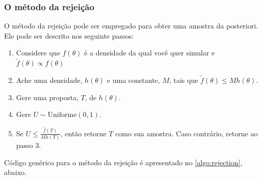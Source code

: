 \subsubsection{O método da rejeição}

O método da rejeição pode ser empregado
para obter uma amostra da posteriori.
Ele pode ser descrito nos seguinte passos:

\begin{enumerate}
 \item Considere que $f(\theta)$ é a
 densidade da qual você quer simular e
 $\tilde{f}(\theta) \propto f(\theta)$
 \item Ache uma densidade, $h(\theta)$ e
 uma constante, $M$, tais que
 $\tilde{f}(\theta) \leq M h(\theta)$.
 \item Gere uma proposta, $T$, de $h(\theta)$.
 \item Gere $U \sim \text{Uniforme}(0,1)$.
 \item Se $U \leq \frac{\tilde{f}(T)}{Mh(T)}$, então
 retorne $T$ como sua amostra.
 Caso contrário, retorne ao passo 3.
\end{enumerate}

Código genérico para o método da rejeição
é apresentado no \cref{algo:rejection}, abaixo.

